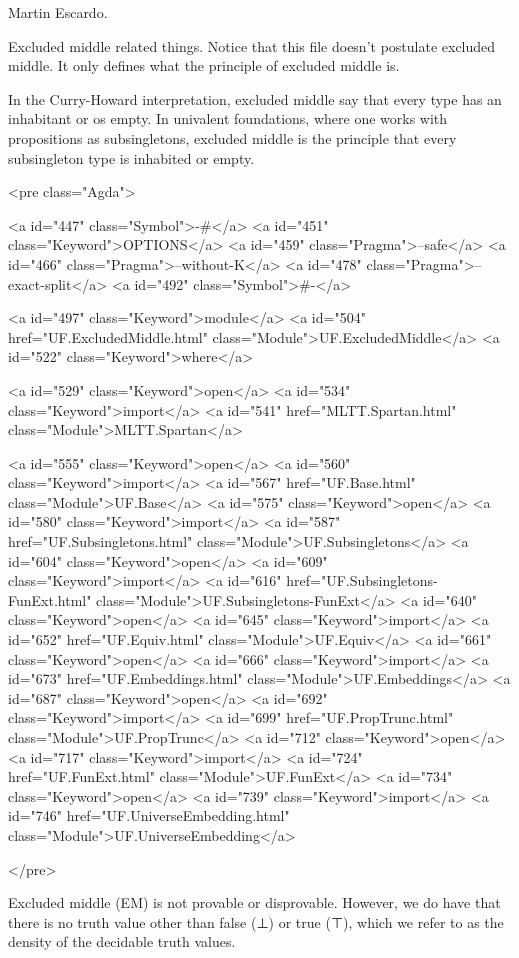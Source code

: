 Martin Escardo.

Excluded middle related things. Notice that this file doesn't
postulate excluded middle. It only defines what the principle of
excluded middle is.

In the Curry-Howard interpretation, excluded middle say that every
type has an inhabitant or os empty. In univalent foundations, where
one works with propositions as subsingletons, excluded middle is the
principle that every subsingleton type is inhabited or empty.

<pre class="Agda">

<a id="447" class="Symbol">{-#</a> <a id="451" class="Keyword">OPTIONS</a> <a id="459" class="Pragma">--safe</a> <a id="466" class="Pragma">--without-K</a> <a id="478" class="Pragma">--exact-split</a> <a id="492" class="Symbol">#-}</a>

<a id="497" class="Keyword">module</a> <a id="504" href="UF.ExcludedMiddle.html" class="Module">UF.ExcludedMiddle</a> <a id="522" class="Keyword">where</a>

<a id="529" class="Keyword">open</a> <a id="534" class="Keyword">import</a> <a id="541" href="MLTT.Spartan.html" class="Module">MLTT.Spartan</a>

<a id="555" class="Keyword">open</a> <a id="560" class="Keyword">import</a> <a id="567" href="UF.Base.html" class="Module">UF.Base</a>
<a id="575" class="Keyword">open</a> <a id="580" class="Keyword">import</a> <a id="587" href="UF.Subsingletons.html" class="Module">UF.Subsingletons</a>
<a id="604" class="Keyword">open</a> <a id="609" class="Keyword">import</a> <a id="616" href="UF.Subsingletons-FunExt.html" class="Module">UF.Subsingletons-FunExt</a>
<a id="640" class="Keyword">open</a> <a id="645" class="Keyword">import</a> <a id="652" href="UF.Equiv.html" class="Module">UF.Equiv</a>
<a id="661" class="Keyword">open</a> <a id="666" class="Keyword">import</a> <a id="673" href="UF.Embeddings.html" class="Module">UF.Embeddings</a>
<a id="687" class="Keyword">open</a> <a id="692" class="Keyword">import</a> <a id="699" href="UF.PropTrunc.html" class="Module">UF.PropTrunc</a>
<a id="712" class="Keyword">open</a> <a id="717" class="Keyword">import</a> <a id="724" href="UF.FunExt.html" class="Module">UF.FunExt</a>
<a id="734" class="Keyword">open</a> <a id="739" class="Keyword">import</a> <a id="746" href="UF.UniverseEmbedding.html" class="Module">UF.UniverseEmbedding</a>

</pre>

Excluded middle (EM) is not provable or disprovable. However, we do
have that there is no truth value other than false (⊥) or true (⊤),
which we refer to as the density of the decidable truth values.

